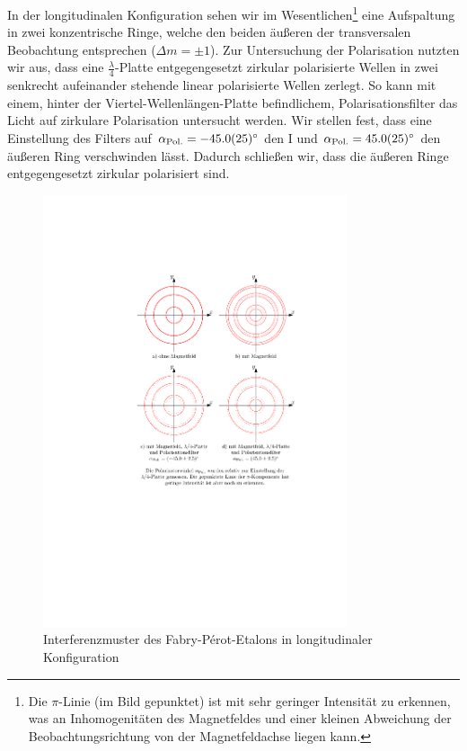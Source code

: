 \documentclass[11pt, a4paper]{article}
\begin{document}
In der longitudinalen Konfiguration sehen wir im Wesentlichen\footnote{Die $\pi$-Linie (im Bild gepunktet) ist mit sehr geringer Intensität zu erkennen, was an Inhomogenitäten des Magnetfeldes und einer kleinen Abweichung der Beobachtungsrichtung von der Magnetfeldachse liegen kann.} eine Aufspaltung in zwei konzentrische Ringe, welche den beiden äußeren der transversalen Beobachtung entsprechen ($\Delta m = \pm 1$).
Zur Untersuchung der Polarisation nutzten wir aus, dass eine $\frac{\lambda}{4}$-Platte entgegengesetzt zirkular polarisierte Wellen in zwei senkrecht aufeinander stehende linear polarisierte Wellen zerlegt.
So kann mit einem, hinter der Viertel-Wellenlängen-Platte befindlichem, Polarisationsfilter das Licht auf zirkulare Polarisation untersucht werden.
Wir stellen fest, dass eine Einstellung des Filters auf $\alpha_\mathrm{Pol.} = \SI{-45 +- 2,5}{\degree}$ den I und $\alpha_\mathrm{Pol.} = \SI{+45 +- 2,5}{\degree}$ den äußeren Ring verschwinden lässt.
Dadurch schließen wir, dass die äußeren Ringe entgegengesetzt zirkular polarisiert sind.
\begin{figure}[h]
	\centering
	\includegraphics[width=0.8\textwidth]{./figures/zeeman_longitudinal.pdf}
	\caption{Interferenzmuster des Fabry-Pérot-Etalons in longitudinaler Konfiguration}
	\label{fig:zeeman_longitudinal}
\end{figure}
\end{document}
